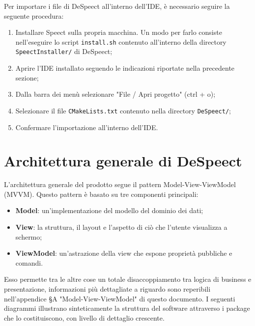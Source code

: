\documentclass[openany,12pt,a4paper]{report}
\begin{document}
	Per importare i file di DeSpeect all'interno dell'IDE, è necessario seguire la seguente procedura:
	\begin{enumerate}
		\item Installare Speect sulla propria macchina. Un modo per farlo consiste nell'eseguire lo script \verb|install.sh| contenuto all'interno della directory \verb|SpeectInstaller/| di DeSpeect;
		\item Aprire l'IDE installato seguendo le indicazioni riportate nella precedente sezione;
		\item Dalla barra dei menù selezionare "File / Apri progetto" (ctrl + o);
		\item Selezionare il file \verb|CMakeLists.txt| contenuto nella directory \verb|DeSpeect/|;
		\item Confermare l'importazione all'interno dell'IDE.
	\end{enumerate}
	

\chapter{Architettura generale di DeSpeect}

L'architettura generale del prodotto segue il pattern Model-View-ViewModel (MVVM). Questo pattern è basato su tre componenti principali:

\begin{itemize}
	\item \textbf{Model}: un'implementazione del modello del dominio dei dati;
	\item \textbf{View}: la struttura, il layout e l'aspetto di ciò che l'utente visualizza a schermo;
	\item \textbf{ViewModel}: un'astrazione della view che espone proprietà pubbliche e comandi.
\end{itemize}

\noindent Esso permette tra le altre cose un totale disaccoppiamento tra logica di business e presentazione, informazioni più dettagliate a riguardo sono reperibili nell'appendice §A "Model-View-ViewModel" di questo documento. I seguenti diagrammi illustrano sinteticamente la struttura del software attraverso i package che lo costituiscono, con livello di dettaglio crescente.
\newpage
\end{document}
